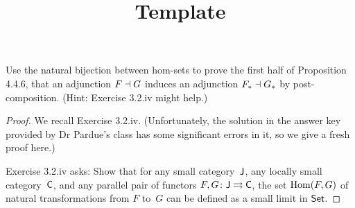 \documentclass[../../solutions]{subfiles}
\title{Template}
\author{}
\begin{document}
\maketitle

%   

\begin{exercise}
  Use the natural bijection between hom-sets to prove the first half
  of Proposition 4.4.6, that an adjunction $F\dashv G$ induces an
  adjunction $F_*\dashv G_*$ by post-composition.  (Hint: Exercise
  3.2.iv might help.)
\end{exercise}

\begin{proof}
  We recall Exercise 3.2.iv.  (Unfortunately, the solution in the
  answer key provided by Dr Pardue's class has some significant errors
  in it, so we give a fresh proof here.)

  Exercise 3.2.iv asks: Show that for any small category~${\mathsf{J}}$, any
  locally small category~${\mathsf{C}}$, and any parallel pair of functors
  ${F,G}\colon{{\mathsf{J}}}\rightrightarrows{{\mathsf{C}}}$, the set $\operatorname{Hom}(F,G)$ of natural
  transformations from $F$ to~$G$ can be defined as a small limit in
  $\mathsf{Set}$.


\end{proof}
\end{document}
